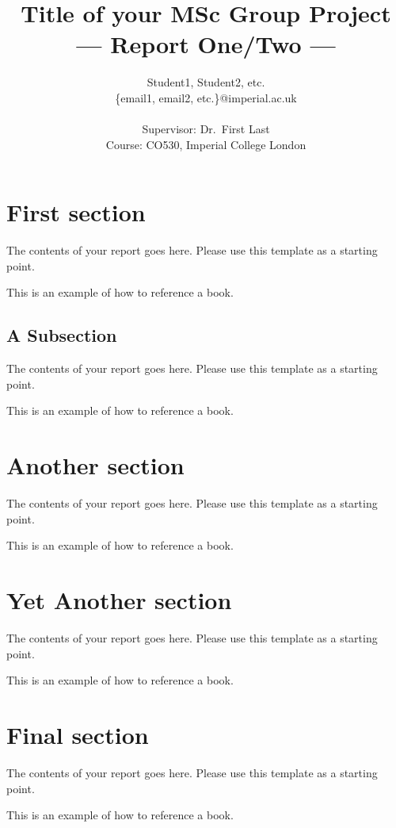 \documentclass[a4paper,11pt]{article}
\title{Title of your MSc Group Project\\\Large{--- Report One/Two ---}}
\author{Student1, Student2, etc.\\
       \{email1, email2, etc.\}@imperial.ac.uk\\ \\
       \small{Supervisor: Dr.\ First Last}\\
       \small{Course: CO530, Imperial College London}
}
\begin{document}
\maketitle

\section{First section}

The contents of your report goes here. Please use this template as a starting
point.

This is an example of how to reference a book\cite{goossens93}.

\subsection{A Subsection}

The contents of your report goes here. Please use this template as a starting
point.

This is an example of how to reference a book\cite{goossens93}.

\section{Another section}

The contents of your report goes here. Please use this template as a starting
point.

This is an example of how to reference a book\cite{goossens93}.

\section{Yet Another section}

The contents of your report goes here. Please use this template as a starting
point.

This is an example of how to reference a book\cite{goossens93}.

\section{Final section}

The contents of your report goes here. Please use this template as a starting
point.

This is an example of how to reference a book\cite{goossens93}.



\end{document}
